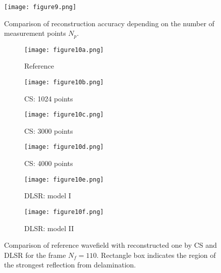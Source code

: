 \begin{figure} [h!]
	\centering
	\texttt{[image: figure9.png]}
	\caption{Comparison of reconstruction accuracy depending on the number of measurement points $N_p$.}
	\label{fig:points_metrics}
\end{figure}

\begin{figure} [h!]
	\centering
	\begin{subfigure}[b]{0.32\textwidth}
		\centering
		\texttt{[image: figure10a.png]}
		\caption{Reference}
		\label{fig:frame110_ref}
	\end{subfigure}
	\hfill
	\begin{subfigure}[b]{0.32\textwidth}
		\centering
		\texttt{[image: figure10b.png]}
		\caption{CS: 1024 points}
		\label{fig:frame110_CS1024}
	\end{subfigure}
	\hfill
	\begin{subfigure}[b]{0.32\textwidth}
		\centering
		\texttt{[image: figure10c.png]}
		\caption{CS: 3000 points}
		\label{fig:frame110_CS3000}
	\end{subfigure}	
	\hfill
	\begin{subfigure}[b]{0.32\textwidth}
		\centering
		\texttt{[image: figure10d.png]}
		\caption{CS: 4000 points}
		\label{fig:frame110_CS4000}
	\end{subfigure}
	\hfill
	\begin{subfigure}[b]{0.32\textwidth}
		\centering
		\texttt{[image: figure10e.png]}
		\caption{DLSR: model I}
		\label{fig:frame110_Abdalraheem}
	\end{subfigure}
	\hfill
	\begin{subfigure}[b]{0.32\textwidth}
		\centering
		\texttt{[image: figure10f.png]}
		\caption{DLSR: model II}
		\label{fig:frame110_Saeed}
	\end{subfigure}
	
	\caption{Comparison of reference wavefield with reconstructed one by CS and DLSR for the frame $N_f = 110$. Rectangle box indicates the region of the strongest reflection from delamination.}
	\label{fig:frame110_comparison}
\end{figure} 

